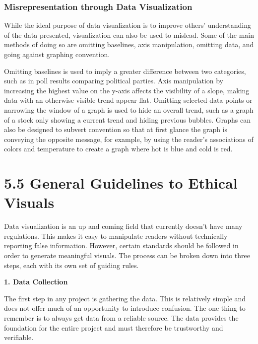 \documentclass[]{book}
\theoremstyle{definition}
\theoremstyle{definition}
\theoremstyle{definition}
\theoremstyle{remark}
\begin{document}
\subsubsection{\texorpdfstring{\textbf{Misrepresentation through Data
Visualization}}{Misrepresentation through Data Visualization}}\label{misrepresentation-through-data-visualization}

While the ideal purpose of data visualization is to improve others'
understanding of the data presented, visualization can also be used to
mislead. Some of the main methods of doing so are omitting baselines,
axis manipulation, omitting data, and going against graphing convention.

Omitting baselines is used to imply a greater difference between two
categories, such as in poll results comparing political parties. Axis
manipulation by increasing the highest value on the y-axis affects the
visibility of a slope, making data with an otherwise visible trend
appear flat. Omitting selected data points or narrowing the window of a
graph is used to hide an overall trend, such as a graph of a stock only
showing a current trend and hiding previous bubbles. Graphs can also be
designed to subvert convention so that at first glance the graph is
conveying the opposite message, for example, by using the reader's
associations of colors and temperature to create a graph where hot is
blue and cold is red.

\section{5.5 General Guidelines to Ethical
Visuals}\label{general-guidelines-to-ethical-visuals}

\citep{ethics_code}

Data visualization is an up and coming field that currently doesn't have
many regulations. This makes it easy to manipulate readers without
technically reporting false information. However, certain standards
should be followed in order to generate meaningful visuals. The process
can be broken down into three steps, each with its own set of guiding
rules.

\textbf{1. Data Collection}

The first step in any project is gathering the data. This is relatively
simple and does not offer much of an opportunity to introduce confusion.
The one thing to remember is to always get data from a reliable source.
The data provides the foundation for the entire project and must
therefore be trustworthy and verifiable.
\end{document}
